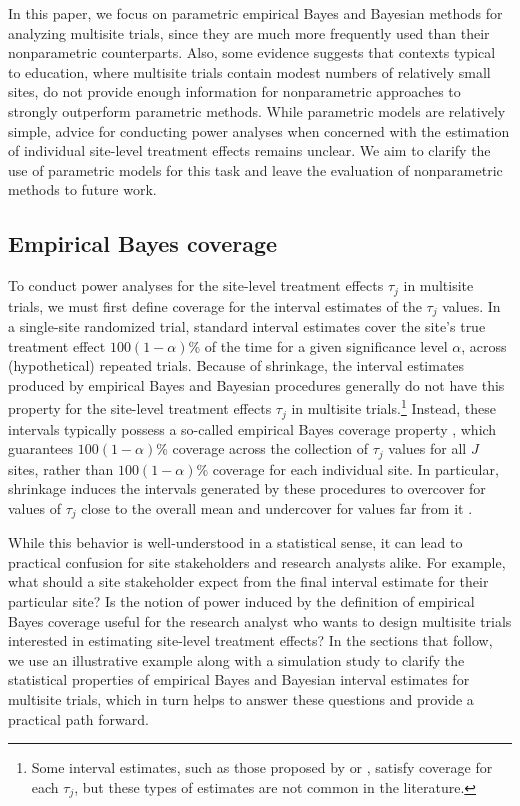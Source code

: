 \documentclass[]{article}
\begin{document}
In this paper, we focus on parametric empirical Bayes and Bayesian methods for analyzing multisite trials, since they are much more frequently used than their nonparametric counterparts.
Also, some evidence suggests that contexts typical to education, where multisite trials contain modest numbers of relatively small sites, do not provide enough information for nonparametric approaches to strongly outperform parametric methods.
While parametric models are relatively simple, advice for conducting power analyses when concerned with the estimation of individual site-level treatment effects remains unclear.
We aim to clarify the use of parametric models for this task and leave the evaluation of nonparametric methods to future work.

\subsection{Empirical Bayes coverage}

To conduct power analyses for the site-level treatment effects $\tau_j$ in multisite trials, we must first define coverage for the interval estimates of the $\tau_j$ values.
In a single-site randomized trial, standard interval estimates cover the site's true treatment effect $100(1-\alpha)$\% of the time for a given significance level $\alpha$, across (hypothetical) repeated trials.
Because of shrinkage, the interval estimates produced by empirical Bayes and Bayesian procedures generally do not have this property for the site-level treatment effects $\tau_j$ in multisite trials.\footnote{Some interval estimates, such as those proposed by \citet{tseng1997good} or \citet{yu2018adaptive}, satisfy coverage for each $\tau_j$, but these types of estimates are not common in the literature.}
Instead, these intervals typically possess a so-called empirical Bayes coverage property \citep{morris1983parametric}, which guarantees $100(1-\alpha)$\% coverage across the collection of $\tau_j$ values for all $J$ sites, rather than $100(1-\alpha)$\% coverage for each individual site.
In particular, shrinkage induces the intervals generated by these procedures to overcover for values of $\tau_j$ close to the overall mean and undercover for values far from it \citep{snijders2011multilevel}.

While this behavior is well-understood in a statistical sense, it can lead to practical confusion for site stakeholders and research analysts alike.
For example, what should a site stakeholder expect from the final interval estimate for their particular site?
Is the notion of power induced by the definition of empirical Bayes coverage useful for the research analyst who wants to design multisite trials interested in estimating site-level treatment effects?
In the sections that follow, we use an illustrative example along with a simulation study to clarify the statistical properties of empirical Bayes and Bayesian interval estimates for multisite trials, which in turn helps to answer these questions and provide a practical path forward.
\end{document}
